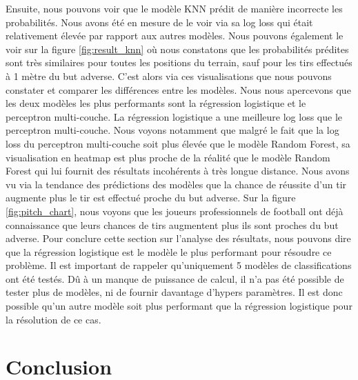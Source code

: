\documentclass[12pt]{article}
\begin{document}
\newline\newline
Ensuite, nous pouvons voir que le modèle KNN prédit de manière incorrecte les probabilités.
Nous avons été en mesure de le voir via sa log loss qui était relativement élevée par rapport aux autres modèles.
Nous pouvons également le voir sur la figure \ref{fig:result_knn} où nous constatons que les probabilités prédites sont très similaires pour toutes les positions du terrain, sauf pour les tirs effectués à 1 mètre du but adverse.
\newline\newline
C'est alors via ces visualisations que nous pouvons constater et comparer les différences entre les modèles.
Nous nous apercevons que les deux modèles les plus performants sont la régression logistique et le perceptron multi-couche.
La régression logistique a une meilleure log loss que le perceptron multi-couche.
Nous voyons notamment que malgré le fait que la log loss du perceptron multi-couche soit plus élevée que le modèle Random Forest, sa visualisation en heatmap est plus proche de la réalité que le modèle Random Forest qui lui fournit des résultats incohérents à très longue distance.
Nous avons vu via la tendance des prédictions des modèles que la chance de réussite d'un tir augmente plus le tir est effectué proche du but adverse.
Sur la figure \ref{fig:pitch_chart}, nous voyons que les joueurs professionnels de football ont déjà connaissance que leurs chances de tirs augmentent plus ils sont proches du but adverse.
\newline\newline
Pour conclure cette section sur l'analyse des résultats, nous pouvons dire que la régression logistique est le modèle le plus performant pour résoudre ce problème. 
Il est important de rappeler qu'uniquement 5 modèles de classifications ont été testés.
Dû à un manque de puissance de calcul, il n'a pas été possible de tester plus de modèles, ni de fournir davantage d'hypers paramètres.
Il est donc possible qu'un autre modèle soit plus performant que la régression logistique pour la résolution de ce cas.
\newpage
\section{Conclusion}
\end{document}
